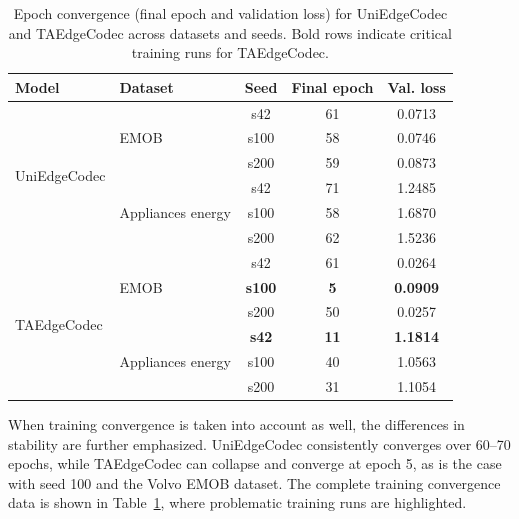 \begin{table}[htbp]
\centering
\small
\caption{Epoch convergence (final epoch and validation loss) for UniEdgeCodec and TAEdgeCodec across datasets and seeds. Bold rows indicate critical training runs for TAEdgeCodec.}
\label{tab:epoch-convergence}
\begin{tabular}{llccc}
\toprule
\textbf{Model} & \textbf{Dataset} & \textbf{Seed} & \textbf{Final epoch} & \textbf{Val. loss} \\
\midrule
\multirow{6}{*}{UniEdgeCodec}
  & \multirow{3}{*}{EMOB}              & s42  & 61 & 0.0713 \\
  &                                    & s100 & 58 & 0.0746 \\
  &                                    & s200 & 59 & 0.0873 \\
\cmidrule{2-5}
  & \multirow{3}{*}{Appliances energy} & s42  & 71 & 1.2485 \\
  &                                    & s100 & 58 & 1.6870 \\
  &                                    & s200 & 62 & 1.5236 \\
\midrule
\multirow{6}{*}{TAEdgeCodec}
  & \multirow{3}{*}{EMOB}              & s42  & 61          & 0.0264 \\
  &                                    & \textbf{s100} & \textbf{5}  & \textbf{0.0909} \\
  &                                    & s200 & 50          & 0.0257 \\
\cmidrule{2-5}
  & \multirow{3}{*}{Appliances energy} & \textbf{s42}  & \textbf{11} & \textbf{1.1814} \\
  &                                    & s100 & 40          & 1.0563 \\
  &                                    & s200 & 31          & 1.1054 \\
\bottomrule
\end{tabular}
\end{table}

When training convergence is taken into account as well, the differences in stability are further emphasized. UniEdgeCodec consistently converges over 60--70 epochs, while TAEdgeCodec can collapse and converge at epoch 5, as is the case with seed 100 and the Volvo EMOB dataset. The complete training convergence data is shown in Table~\ref{tab:epoch-convergence}, where problematic training runs are highlighted. 

